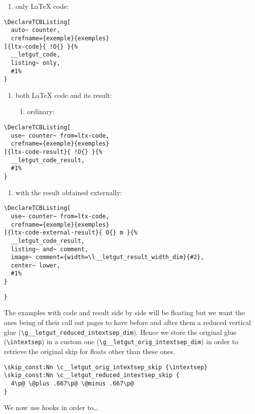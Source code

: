 \documentclass{letgut}
\begin{document}
\begin{enumerate}
\item only \LaTeX{} code:
\end{enumerate}
\begin{lstlisting}
\DeclareTCBListing[
  auto~ counter,
  crefname={exemple}{exemples}
]{ltx-code}{ !O{} }{%
  __letgut_code,
  listing~ only,
  #1%
}
\end{lstlisting}
\begin{enumerate}
\item both \LaTeX{} code and its result:
\begin{enumerate}
\item ordinary:
\end{enumerate}
\end{enumerate}
\begin{lstlisting}
\DeclareTCBListing[
  use~ counter~ from=ltx-code,
  crefname={exemple}{exemples}
]{ltx-code-result}{ !O{} }{%
  __letgut_code_result,
  #1%
}
\end{lstlisting}
\begin{enumerate}
\item with the result obtained externally:
\end{enumerate}
\begin{lstlisting}
\DeclareTCBListing[
  use~ counter~ from=ltx-code,
  crefname={exemple}{exemples}
]{ltx-code-external-result}{ O{} m }{%
  __letgut_code_result,
  listing~ and~ comment,
  image~ comment={width=\l__letgut_result_width_dim}{#2},
  center~ lower,
  #1%
}
\end{lstlisting}

\begin{lstlisting}
}
\end{lstlisting}

The examples with code and result side by side will be floating but we want the
ones being of their call out pages to have before and after them a reduced
vertical glue (\lstinline+\g__letgut_reduced_intextsep_dim+). Hence we store the original
glue (\lstinline+\intextsep+) in a custom one (\lstinline+\g__letgut_orig_intextsep_dim+) in order
to retrieve the original skip for floats other than these ones.

\begin{lstlisting}
\skip_const:Nn \c__letgut_orig_intextsep_skip {\intextsep}
\skip_const:Nn \c__letgut_reduced_intextsep_skip {
  4\p@ \@plus .667\p@ \@minus .667\p@
}
\end{lstlisting}

We now use hooks in order to\ldots{}
\end{document}
